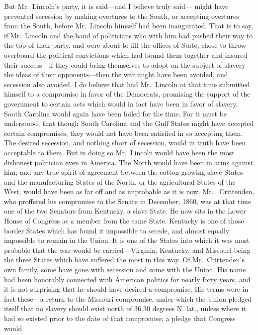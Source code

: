 But Mr.\ Lincoln's party, it is said---and I believe truly said---%
might have prevented secession by making overtures to the South, or
accepting overtures from the South, before Mr.\ Lincoln himself had
been inaugurated.  That is to say, if Mr.\ Lincoln and the band of
politicians who with him had pushed their way to the top of their
party, and were about to fill the offices of State, chose to throw
overboard the political convictions which had bound them together
and insured their success---if they could bring themselves to adopt
on the subject of slavery the ideas of their opponents---then the
war might have been avoided, and secession also avoided.  I do
believe that had Mr.\ Lincoln at that time submitted himself to a
compromise in favor of the Democrats, promising the support of the
government to certain acts which would in fact have been in favor
of slavery, South Carolina would again have been foiled for the
time.  For it must be understood, that though South Carolina and
the Gulf States might have accepted certain compromises, they would
not have been satisfied in so accepting them.  The desired
secession, and nothing short of secession, would in truth have been
acceptable to them.  But in doing so Mr.\ Lincoln would have been
the most dishonest politician even in America.  The North would
have been in arms against him; and any true spirit of agreement
between the cotton-growing slave States and the manufacturing
States of the North, or the agricultural States of the West, would
have been as far off and as improbable as it is now.  Mr.\ %
Crittenden, who proffered his compromise to the Senate in December,
1860, was at that time one of the two Senators from Kentucky, a
slave State.  He now sits in the Lower House of Congress as a
member from the same State.  Kentucky is one of those border States
which has found it impossible to secede, and almost equally
impossible to remain in the Union.  It is one of the States into
which it was most probable that the war would be carried---Virginia,
Kentucky, and Missouri being the three States which have suffered
the most in this way.  Of Mr.\ Crittenden's own family, some have
gone with secession and some with the Union.  His name had been
honorably connected with American politics for nearly forty years,
and it is not surprising that he should have desired a compromise.
His terms were in fact these---a return to the Missouri compromise,
under which the Union pledged itself that no slavery should exist
north of 36.30 degrees N. lat., unless where it had so existed
prior to the date of that compromise; a pledge that Congress would
